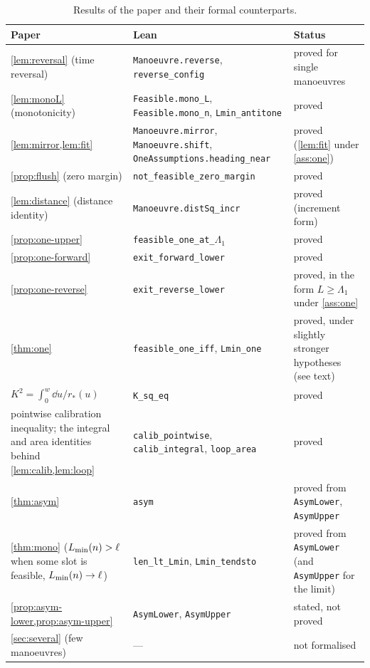 \begin{table}[ht]
\centering\small
\begin{tabular}{@{}>{\raggedright\arraybackslash}p{}>{\raggedright\arraybackslash}p{}>{\raggedright\arraybackslash}p{}@{}}
\toprule
Paper & Lean & Status\\
\midrule
\cref{lem:reversal} (time reversal) & \texttt{Manoeuvre.reverse}, \texttt{reverse\_config} & proved for single manoeuvres\\
\cref{lem:monoL} (monotonicity) & \texttt{Feasible.mono\_L}, \texttt{Feasible.mono\_n}, \texttt{Lmin\_antitone} & proved\\
\cref{lem:mirror,lem:fit} & \texttt{Manoeuvre.mirror}, \texttt{Manoeuvre.shift}, \texttt{OneAssumptions.heading\_near} & proved (\cref{lem:fit} under \cref{ass:one})\\
\cref{prop:flush} (zero margin) & \texttt{not\_feasible\_zero\_margin} & proved\\
\cref{lem:distance} (distance identity) & \texttt{Manoeuvre.distSq\_incr} & proved (increment form)\\
\cref{prop:one-upper} & \texttt{feasible\_one\_at\_}$\Lambda_1$ & proved\\
\cref{prop:one-forward} & \texttt{exit\_forward\_lower} & proved\\
\cref{prop:one-reverse} & \texttt{exit\_reverse\_lower} & proved, in the form $L\ge\Lambda_1$ under \cref{ass:one}\\
\cref{thm:one} & \texttt{feasible\_one\_iff}, \texttt{Lmin\_one} & proved, under slightly stronger hypotheses (see text)\\
$K^2=\int_0^w\dd u/r_*(u)$ & \texttt{K\_sq\_eq} & proved\\
pointwise calibration inequality; the integral and area identities behind \cref{lem:calib,lem:loop} & \texttt{calib\_pointwise}, \texttt{calib\_integral}, \texttt{loop\_area} & proved\\
\midrule
\cref{thm:asym} & \texttt{asym} & proved from \texttt{AsymLower}, \texttt{AsymUpper}\\
\cref{thm:mono} ($L_{\min}(n)>\ell$ when some slot is feasible, $L_{\min}(n)\to\ell$) & \texttt{len\_lt\_Lmin}, \texttt{Lmin\_tendsto} & proved from \texttt{AsymLower} (and \texttt{AsymUpper} for the limit)\\
\cref{prop:asym-lower,prop:asym-upper} & \texttt{AsymLower}, \texttt{AsymUpper} & stated, not proved\\
\cref{sec:several} (few manoeuvres) & --- & not formalised\\
\bottomrule
\end{tabular}
\caption{Results of the paper and their formal counterparts.}
\label{tab:lean}
\end{table}

